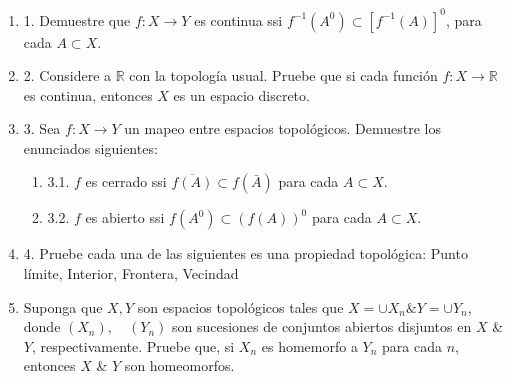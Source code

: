 \documentclass[a4paper, 12pt]{article}
\begin{document}

\setcounter{page}{1}




\begin{problema}
    \begin{enumerate}
        \item 1. Demuestre que $f: X \rightarrow Y$ es continua ssi $f^{-1}\left(A^0\right) \subset\left[f^{-1}(A)\right]^0$, para cada $A \subset X$.
        \item  2. Considere a $\mathbb{R}$ con la topología usual. Pruebe que si cada función $f: X \rightarrow \mathbb{R}$ es continua, entonces $X$ es un espacio discreto.
        \item  3. Sea $f: X \rightarrow Y$ un mapeo entre espacios topológicos. Demuestre los enunciados siguientes:
        \begin{enumerate}
            \item 3.1. $f$ es cerrado ssi $\overline{f(A)} \subset f(\bar{A})$ para cada $A \subset X$.
            \item 3.2. $f$ es abierto ssi $f\left(A^0\right) \subset(f(A))^0$ para cada $A \subset X$.
        \end{enumerate}
        
        \item 4. Pruebe cada una de las siguientes es una propiedad topológica: Punto límite, Interior, Frontera, Vecindad
        \item Suponga que $X, Y$ son espacios topológicos tales que $X=\cup X_n \& Y=\cup Y_n$, donde $\left(X_n\right), \quad\left(Y_n\right)$ son sucesiones de conjuntos abiertos disjuntos en $X$ \& $Y$, respectivamente. Pruebe que, si $X_n$ es homemorfo a $Y_n$ para cada $n$, entonces $X$ \& $Y$ son homeomorfos.
    \end{enumerate}
\end{problema}
\end{document}
